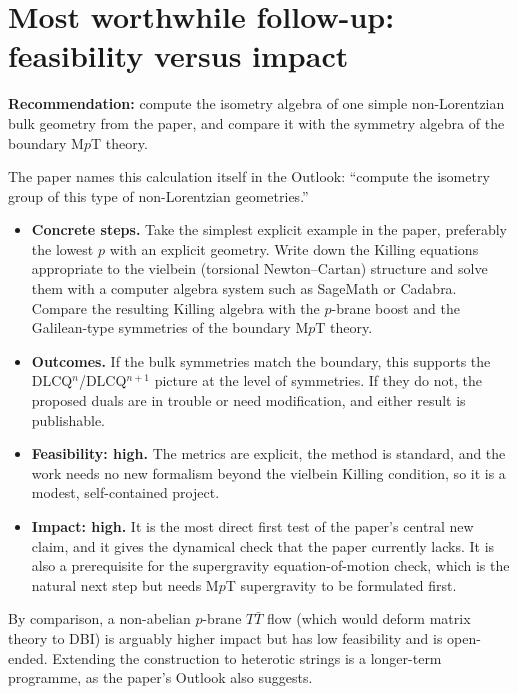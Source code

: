 \documentclass[11pt]{article}
\begin{document}
\section{Most worthwhile follow-up: feasibility versus impact}

\textbf{Recommendation:} compute the isometry algebra of one simple non-Lorentzian bulk geometry from the paper, and compare it with the symmetry algebra of the boundary M$p$T theory.

\noindent The paper names this calculation itself in the Outlook: ``compute the isometry group of this type of non-Lorentzian geometries.''

\begin{itemize}
\item \textbf{Concrete steps.} Take the simplest explicit example in the paper, preferably the lowest $p$ with an explicit geometry. Write down the Killing equations appropriate to the vielbein (torsional Newton--Cartan) structure and solve them with a computer algebra system such as SageMath or Cadabra. Compare the resulting Killing algebra with the $p$-brane boost and the Galilean-type symmetries of the boundary M$p$T theory.
\item \textbf{Outcomes.} If the bulk symmetries match the boundary, this supports the DLCQ$^n$/DLCQ$^{n+1}$ picture at the level of symmetries. If they do not, the proposed duals are in trouble or need modification, and either result is publishable.
\item \textbf{Feasibility: high.} The metrics are explicit, the method is standard, and the work needs no new formalism beyond the vielbein Killing condition, so it is a modest, self-contained project.
\item \textbf{Impact: high.} It is the most direct first test of the paper's central new claim, and it gives the dynamical check that the paper currently lacks. It is also a prerequisite for the supergravity equation-of-motion check, which is the natural next step but needs M$p$T supergravity to be formulated first.
\end{itemize}

\noindent By comparison, a non-abelian $p$-brane $T\bar T$ flow (which would deform matrix theory to DBI) is arguably higher impact but has low feasibility and is open-ended. Extending the construction to heterotic strings is a longer-term programme, as the paper's Outlook also suggests.
\end{document}
